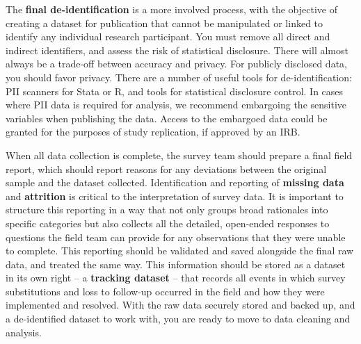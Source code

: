 The \textbf{final de-identification} is a more involved process,
with the objective of creating a dataset for publication
that cannot be manipulated or linked to identify any individual research participant.
You must remove all direct and indirect identifiers, and assess the risk of statistical disclosure.
There will almost always be a trade-off between accuracy and privacy.
For publicly disclosed data, you should favor privacy.
There are a number of useful tools for de-identification: PII scanners for Stata
or R,
and tools for statistical disclosure control.
In cases where PII data is required for analysis,
we recommend embargoing the sensitive variables when publishing the data.
Access to the embargoed data could be granted for the purposes of study replication, if approved by an IRB.

When all data collection is complete, the survey team should prepare a final field report,
which should report reasons for any deviations between the original sample and the dataset collected.
Identification and reporting of \textbf{missing data} and \textbf{attrition}
is critical to the interpretation of survey data.
It is important to structure this reporting in a way that not only
groups broad rationales into specific categories
but also collects all the detailed, open-ended responses
to questions the field team can provide for any observations that they were unable to complete.
This reporting should be validated and saved alongside the final raw data, and treated the same way.
This information should be stored as a dataset in its own right
-- a \textbf{tracking dataset} -- that records all events in which survey substitutions
and loss to follow-up occurred in the field and how they were implemented and resolved.
With the raw data securely stored and backed up,
and a de-identified dataset to work with, you are ready to move to data cleaning and analysis.

